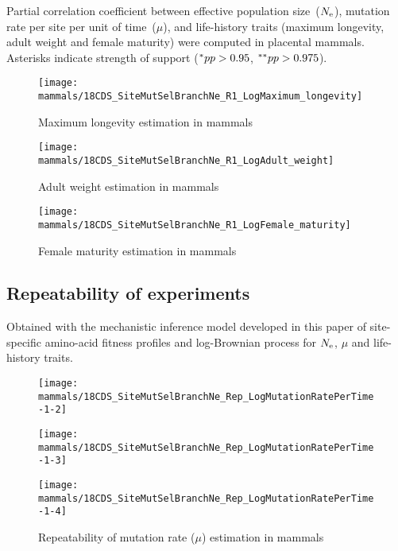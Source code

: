 \begin{table}[H]
    
    \caption[Partial correlation coefficient matrix in mammals]{
    Partial correlation coefficient between effective population size~($N_{\text{e}}$), mutation rate per site per unit of time~($\mu$), and life-history traits (maximum longevity, adult weight and female maturity) were computed in placental mammals.
    Asterisks indicate strength of support ($\smash{^{*}} pp > 0.95$, $\smash{^{**}} pp > 0.975$).}
    \label{tab:table-partcor-mammals}
\end{table}

\begin{figure}[H]
    \centering
    \texttt{[image: mammals/18CDS\_SiteMutSelBranchNe\_R1\_LogMaximum\_longevity]}
    \caption[Maximum longevity estimation in mammals]{Maximum longevity estimation in mammals}
\end{figure}

\begin{figure}[H]
    \centering
    \texttt{[image: mammals/18CDS\_SiteMutSelBranchNe\_R1\_LogAdult\_weight]}
    \caption[Adult weight estimation in mammals]{Adult weight estimation in mammals}
\end{figure}

\begin{figure}[H]
    \centering
    \texttt{[image: mammals/18CDS\_SiteMutSelBranchNe\_R1\_LogFemale\_maturity]}
    \caption[Female maturity estimation in mammals]{Female maturity estimation in mammals}
\end{figure}

\subsection{Repeatability of experiments}
Obtained with the mechanistic inference model developed in this paper of site-specific amino-acid fitness profiles and log-Brownian process for $N_{\text{e}}$, $\mu$ and life-history traits.

\begin{figure}[H]
    \centering
    \begin{minipage}{0.32\linewidth}
        \texttt{[image: mammals/18CDS\_SiteMutSelBranchNe\_Rep\_LogMutationRatePerTime-1-2]}
    \end{minipage} \hfill
    \begin{minipage}{0.32\linewidth}
        \texttt{[image: mammals/18CDS\_SiteMutSelBranchNe\_Rep\_LogMutationRatePerTime-1-3]}
    \end{minipage} \hfill
    \begin{minipage}{0.32\linewidth}
        \texttt{[image: mammals/18CDS\_SiteMutSelBranchNe\_Rep\_LogMutationRatePerTime-1-4]}
    \end{minipage}
    \caption[Repeatability of mutation rate estimation in mammals]{Repeatability of mutation rate ($\mu$) estimation in mammals}
\end{figure}

